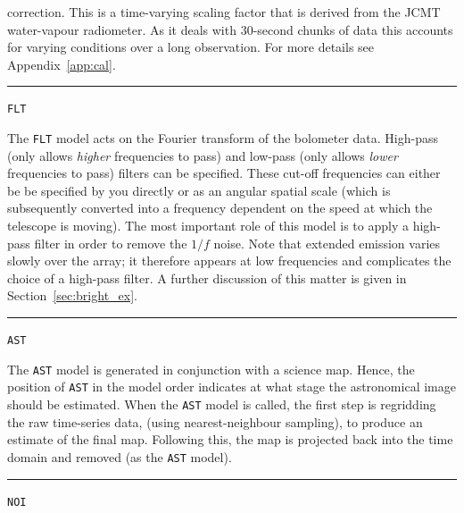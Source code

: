 \documentclass[twoside,11pt]{article}
\newcommand{\htmlref}[2]{#1}
\newenvironment{latexonly}{}{}
\newcommand{\latexhtml}[2]{#1}
\renewcommand{\_}{\texttt{\symbol{95}}}
\newcommand{\model}[1]{\texttt{#1}}
\newcommand{\cref}[3]{\latexhtml{#1~\ref{#2}}{\htmlref{#3}{#2}}}
\begin{document}
\begin{latexonly}
\begin{minipage}[t]{0.88\linewidth}
correction. This is a time-varying scaling factor that is derived from
the JCMT water-vapour radiometer. As it deals with 30-second chunks of
data this accounts for varying conditions over a long observation. For
more details see \cref{Appendix}{app:cal}{SCUBA-2 data calibration}. \\
\end{minipage}
\hrule
\vspace{0.1cm}
\begin{minipage}[t]{0.12\linewidth}
\centering\model{FLT}
\end{minipage}
\begin{minipage}[t]{0.88\linewidth}The \model{FLT} model acts on the Fourier transform
of the bolometer data. High-pass (only allows \textit{higher} frequencies to
pass) and low-pass (only allows \textit{lower} frequencies to pass) filters
can be specified. These cut-off frequencies can either be be specified by
you directly or as an angular spatial scale (which is subsequently
converted into a frequency dependent on the speed at which the
telescope is moving). The most important role of this model is to
apply a high-pass filter in order to remove the $1/f$ noise. Note that
extended emission varies slowly over the array; it therefore appears
at low frequencies and complicates the choice of a high-pass filter. A
further discussion of this matter is given in
\cref{Section}{sec:bright_ex}{Extended galactic sources}.\\
\end{minipage}
\hrule
\vspace{0.1cm}
\begin{minipage}[t]{0.12\linewidth}
\centering\model{AST}
\end{minipage}
\begin{minipage}[t]{0.88\linewidth}The \model{AST} model is generated in
conjunction with a science map. Hence, the position of \model{AST} in the
model order indicates at what stage the astronomical
image should be estimated. When the \model{AST} model is called, the first
step is regridding the raw time-series data, (using nearest-neighbour sampling),
to produce an estimate of the final map. Following this, the map is
projected back into the time domain and removed (as the \model{AST}
model).\\
\end{minipage}
\hrule
\vspace{0.1cm}
\begin{minipage}[t]{0.12\linewidth}
\centering\model{NOI}
\end{minipage}

\end{latexonly}
\end{document}
